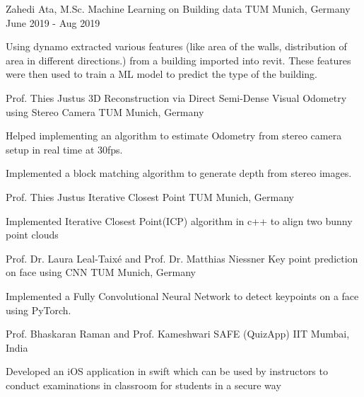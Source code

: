 \begin{cventries}
	\cventry
	{Zahedi Ata, M.Sc.} %
	{Machine Learning on Building data} %
	{TUM Munich, Germany} %
	{June 2019 - Aug 2019} %
	{
		\begin{cvitems} %
			\item {Using dynamo extracted various features (like area of the walls, distribution of area in different directions.) from a building imported into revit. 
			These features were then used to train a ML model to predict the type of the building.}
		\end{cvitems}
	}

  	\cventry
    {Prof. Thies Justus} %
    {3D Reconstruction via Direct Semi-Dense Visual Odometry using Stereo Camera} %
    {TUM Munich, Germany} %
    {} %
    {
      \begin{cvitems} %
      	\item {Helped implementing an algorithm to estimate Odometry from stereo camera setup in real time at 30fps.}
		\item {Implemented a block matching algorithm to generate depth from stereo images.}
      \end{cvitems}
    }

	\cventry
	{Prof. Thies Justus} %
	{Iterative Closest Point} %
	{TUM Munich, Germany} %
	{} %
	{
		\begin{cvitems} %
			\item {Implemented Iterative Closest Point(ICP) algorithm in c++ to align two bunny point clouds}
		\end{cvitems}
	}

	\cventry
	{Prof. Dr. Laura Leal-Taixé and Prof. Dr. Matthias Niessner} %
	{Key point prediction on face using CNN} %
	{TUM Munich, Germany} %
	{} %
	{
		\begin{cvitems} %
			\item {Implemented a Fully Convolutional Neural Network to detect keypoints on a face using PyTorch.}
		\end{cvitems}
	}
	
	\cventry
	{Prof. Bhaskaran Raman and Prof. Kameshwari} %
	{SAFE (QuizApp)} %
	{IIT Mumbai, India} %
	{} %
	{
		\begin{cvitems} %
			\item {Developed an iOS application in swift which can be used by instructors to conduct examinations in classroom for students in a secure way}
		\end{cvitems}
	}
	

\end{cventries}
